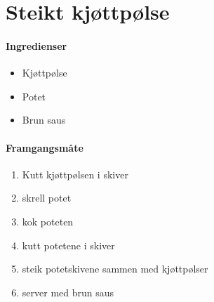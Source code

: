 \section{Steikt kjøttpølse}


\paragraph{Ingredienser}
\begin{itemize}[noitemsep]
	\item Kjøttpølse
	\item Potet
	\item Brun saus
\end{itemize}

\paragraph{Framgangsmåte}
\begin{enumerate}[noitemsep]
	\item Kutt kjøttpølsen i skiver
	\item skrell potet
	\item kok poteten
	\item kutt potetene i skiver
	\item steik potetskivene sammen med kjøttpølser
	\item server med brun saus
\end{enumerate}
